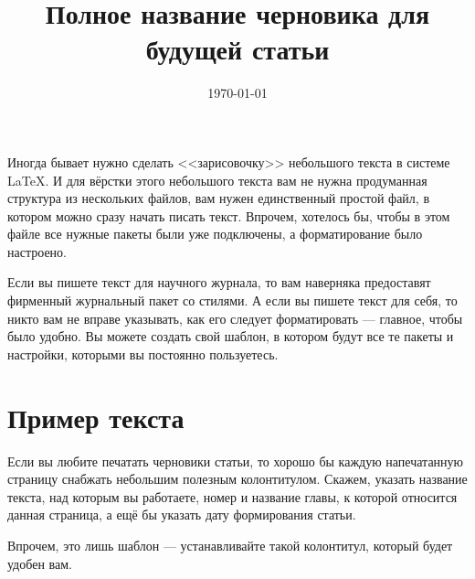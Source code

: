\documentclass[a4paper,12pt]{article}
\begin{document}
\title{Полное название черновика для будущей статьи}
\date{\today}
\maketitle

Иногда бывает нужно сделать <<зарисовочку>> небольшого текста в системе \LaTeX. И для вёрстки этого небольшого текста вам не нужна продуманная структура из нескольких файлов, вам нужен единственный простой файл, в котором можно сразу начать писать текст. Впрочем, хотелось бы, чтобы в этом файле все нужные пакеты были уже подключены, а форматирование было настроено. 

Если вы пишете текст для научного журнала, то вам наверняка предоставят фирменный журнальный пакет со стилями. А если вы пишете текст для себя, то никто вам не вправе указывать, как его следует форматировать --- главное, чтобы было удобно. Вы можете создать свой шаблон, в котором будут все те пакеты и настройки, которыми вы постоянно пользуетесь.

\clearpage
\section{Пример текста}
Если вы любите печатать черновики статьи, то хорошо бы каждую напечатанную страницу снабжать небольшим полезным колонтитулом. Скажем, указать название текста, над которым вы работаете, номер и название главы, к которой относится данная страница, а ещё бы указать дату формирования статьи.

Впрочем, это лишь шаблон --- устанавливайте такой колонтитул, который будет удобен вам.
\end{document}
